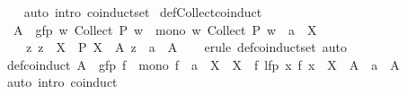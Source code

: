 \begin{isabellebody}
%
\isadelimproof
\ \ %
\endisadelimproof
%
\isatagproof
{}\isamarkupfalse%
\ {\isacharparenleft}{\kern0pt}auto\ intro{\isacharbang}{\kern0pt}{\isacharcolon}{\kern0pt}\ coinduct{\isacharunderscore}{\kern0pt}set{\isacharparenright}{\kern0pt}%
\endisatagproof
{\isafoldproof}%
%
\isadelimproof
\isanewline
%
\endisadelimproof
\isanewline
{}\isamarkupfalse%
\ def{\isacharunderscore}{\kern0pt}Collect{\isacharunderscore}{\kern0pt}coinduct{\isacharcolon}{\kern0pt}\isanewline
\ \ {\isachardoublequoteopen}A\ {\isasymequiv}\ gfp\ {\isacharparenleft}{\kern0pt}{\isasymlambda}w{\isachardot}{\kern0pt}\ Collect\ {\isacharparenleft}{\kern0pt}P\ w{\isacharparenright}{\kern0pt}{\isacharparenright}{\kern0pt}\ {\isasymLongrightarrow}\ mono\ {\isacharparenleft}{\kern0pt}{\isasymlambda}w{\isachardot}{\kern0pt}\ Collect\ {\isacharparenleft}{\kern0pt}P\ w{\isacharparenright}{\kern0pt}{\isacharparenright}{\kern0pt}\ {\isasymLongrightarrow}\ a\ {\isasymin}\ X\ {\isasymLongrightarrow}\isanewline
\ \ \ \ {\isacharparenleft}{\kern0pt}{\isasymAnd}z{\isachardot}{\kern0pt}\ z\ {\isasymin}\ X\ {\isasymLongrightarrow}\ P\ {\isacharparenleft}{\kern0pt}X\ {\isasymunion}\ A{\isacharparenright}{\kern0pt}\ z{\isacharparenright}{\kern0pt}\ {\isasymLongrightarrow}\ a\ {\isasymin}\ A{\isachardoublequoteclose}\isanewline
%
\isadelimproof
\ \ %
\endisadelimproof
%
\isatagproof
{}\isamarkupfalse%
\ {\isacharparenleft}{\kern0pt}erule\ def{\isacharunderscore}{\kern0pt}coinduct{\isacharunderscore}{\kern0pt}set{\isacharparenright}{\kern0pt}\ auto%
\endisatagproof
{\isafoldproof}%
%
\isadelimproof
\isanewline
%
\endisadelimproof
\isanewline
{}\isamarkupfalse%
\ def{\isacharunderscore}{\kern0pt}coinduct{}{\isacharcolon}{\kern0pt}\ {\isachardoublequoteopen}A\ {\isasymequiv}\ gfp\ f\ {\isasymLongrightarrow}\ mono\ f\ {\isasymLongrightarrow}\ a\ {\isasymin}\ X\ {\isasymLongrightarrow}\ X\ {\isasymsubseteq}\ f\ {\isacharparenleft}{\kern0pt}lfp\ {\isacharparenleft}{\kern0pt}{\isasymlambda}x{\isachardot}{\kern0pt}\ f\ x\ {\isasymunion}\ X\ {\isasymunion}\ A{\isacharparenright}{\kern0pt}{\isacharparenright}{\kern0pt}\ {\isasymLongrightarrow}\ a\ {\isasymin}\ A{\isachardoublequoteclose}\isanewline
%
\isadelimproof
\ \ %
\endisadelimproof
%
\isatagproof
{}\isamarkupfalse%
\ {\isacharparenleft}{\kern0pt}auto\ intro{\isacharbang}{\kern0pt}{\isacharcolon}{\kern0pt}\ coinduct{}{\isacharparenright}{\kern0pt}%
\endisatagproof
{\isafoldproof}%
%
\isadelimproof
%
\endisadelimproof
%
\begin{isamarkuptext}%

\end{isamarkuptext}
\end{isabellebody}
